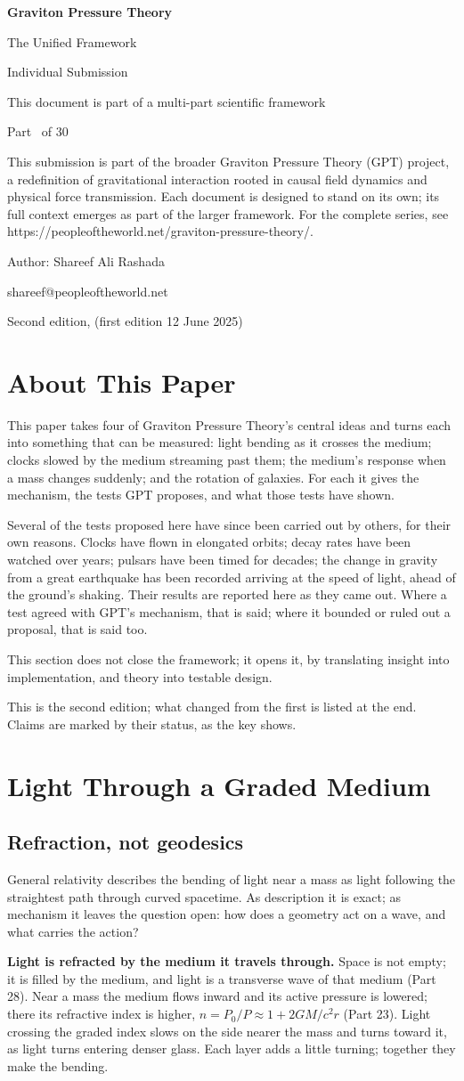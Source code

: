 \documentclass[11pt,a4paper]{article}
\makeatletter
\newcommand{\gptitle}{%
  \begin{titlepage}\centering
  \vspace*{3cm}
  {\Huge\bfseries Graviton Pressure Theory\par}\vspace{0.8cm}
  {\Large The Unified Framework\par}\vspace{0.2cm}
  {\large Individual Submission\par}\vspace{0.6cm}
  {\normalsize This document is part of a multi-part scientific framework\par}\vspace{2cm}
  {\normalsize Part \gptpart\ of 30\par}\vspace{0.8cm}
  {\huge\bfseries \gpttitle\par}\vspace{0.6cm}
  {\Large \gptsubtitle\par}\vspace{1.5cm}
  {\small\begin{minipage}{0.75\textwidth}\centering This submission is part of the broader Graviton Pressure Theory (GPT) project, a redefinition of gravitational interaction rooted in causal field dynamics and physical force transmission. Each document is designed to stand on its own; its full context emerges as part of the larger framework. For the complete series, see https://peopleoftheworld.net/graviton-pressure-theory/.\end{minipage}\par}
  \vfill
  {\large Author: Shareef Ali Rashada\par}\vspace{0.2cm}
  {\normalsize shareef@peopleoftheworld.net\par}\vspace{0.5cm}
  {\normalsize Second edition, \gptdate \quad (first edition 12 June 2025)\par}
  \end{titlepage}
  \setcounter{page}{1}\tableofcontents\clearpage}
\makeatother
\begin{document}
\gptitle

\section*{About This Paper}

This paper takes four of Graviton Pressure Theory's central ideas and turns each into something that can be measured: light bending as it crosses the medium; clocks slowed by the medium streaming past them; the medium's response when a mass changes suddenly; and the rotation of galaxies. For each it gives the mechanism, the tests GPT proposes, and what those tests have shown.

Several of the tests proposed here have since been carried out by others, for their own reasons. Clocks have flown in elongated orbits; decay rates have been watched over years; pulsars have been timed for decades; the change in gravity from a great earthquake has been recorded arriving at the speed of light, ahead of the ground's shaking. Their results are reported here as they came out. Where a test agreed with GPT's mechanism, that is said; where it bounded or ruled out a proposal, that is said too.

This section does not close the framework; it opens it, by translating insight into implementation, and theory into testable design.

This is the second edition; what changed from the first is listed at the end. Claims are marked by their status, as the key shows.

\statuskey

\section{Light Through a Graded Medium}

\subsection{Refraction, not geodesics}

General relativity describes the bending of light near a mass as light following the straightest path through curved spacetime. As description it is exact; as mechanism it leaves the question open: how does a geometry act on a wave, and what carries the action?

\begin{hypbar}
\textbf{Light is refracted by the medium it travels through.} Space is not empty; it is filled by the medium, and light is a transverse wave of that medium (Part 28).\footnotemark{} Near a mass the medium flows inward and its active pressure is lowered; there its refractive index is higher, $n = P_0/P \approx 1 + 2GM/c^2r$ (Part 23).\footnotemark{} Light crossing the graded index slows on the side nearer the mass and turns toward it, as light turns entering denser glass. Each layer adds a little turning; together they make the bending.
\end{hypbar}
\addtocounter{footnote}{-1}
\end{document}
